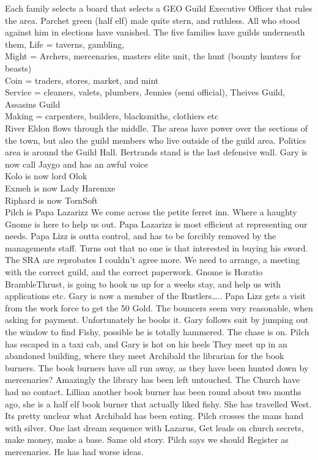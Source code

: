 Each family selects a board that selects a GEO Guild Executive Officer that rules the area.\medskip
Parchet green (half elf) male quite stern, and ruthless. All who stood against him in elections have vanished.\medskip
The five families have guilds underneath them,\medskip
Life = taverns, gambling,\\
Might = Archers, mercenaries, masters elite unit, the hunt (bounty hunters for beasts)\\
Coin = traders, stores, market, and mint\\
Service = cleaners, valets, plumbers, Jennies (semi official), Theives Guild, Assasins Guild\\
Making = carpenters, builders, blacksmiths, clothiers etc\\
River Eldon flows through the middle. The areas have power over the sections of the town, but also the guild members who live outside of the guild area.\medskip
Politics area is around the Guild Hall.\medskip
Bertrands stand is the last defensive wall.\medskip
Gary is now call Jaygo and has an awful voice\\
Kolo is now lord Olok\\
Exmeh is now Lady Haremxe\\
Riphard is now TornSoft\\
Pilch is Papa Lazarizz\medskip
We come across the petite ferret inn. Where a haughty Gnome is here to help us out.\medskip
Papa Lazarizz is most efficient at representing our needs.\medskip
Papa Lizz is outta control, and has to be forcibly removed by the managements staff. Turns out that no one is that interested in buying his sword.\medskip
The SRA are reprobates I couldn’t agree more.\medskip
We need to arrange, a meeting with the correct guild, and the correct paperwork.\medskip
Gnome is Horatio BrambleThrust, is going to hook us up for a weeks stay, and help us with applications etc.\medskip
Gary is now a member of the Rustlers…..\medskip
Papa Lizz gets a visit from the work force to get the 50 Gold. The bouncers seem very reasonable, when asking for payment. Unfortunately he books it.\medskip
Gary follows suit by jumping out the window to find Fishy, possible he is totally hammered. The chase is on. Pilch has escaped in a taxi cab, and Gary is hot on his heels They meet up in an abandoned building, where they meet Archibald the librarian for the book burners. The book burners have all run away, as they have been hunted down by mercenaries? Amazingly the library has been left untouched. The Church have had no contact. Lillian another book burner has been round about two months ago, she is a half elf book burner that actually liked fishy. She has travelled West.\medskip
Its pretty unclear what Archibald has been eating. Pilch crosses the mans hand with silver.\medskip
One last dream sequence with Lazarus,\medskip
Get leads on church secrets, make money, make a base. Same old story.\medskip
Pilch says we should Register as mercenaries. He has had worse ideas.
